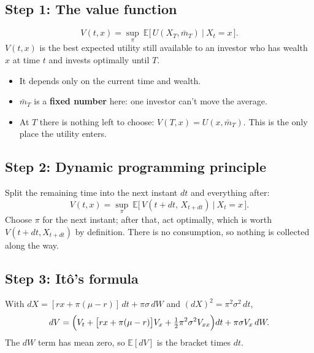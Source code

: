 \documentclass[11pt]{article}
\newcommand{\E}{\mathbb{E}}
\newcommand{\mb}{\bar m}
\begin{document}
\subsection*{Step 1: The value function}
\[
  V(t,x) = \sup_{\pi}\ \E\bigl[\,U(X_T,\mb_T)\ \big|\ X_t = x\,\bigr] .
\]
$V(t,x)$ is the best expected utility still available to an investor who has wealth $x$ at
time $t$ and invests optimally until $T$.
\begin{itemize}
  \item It depends only on the current time and wealth.
  \item $\mb_T$ is a \textbf{fixed number} here: one investor can't move the average.
  \item At $T$ there is nothing left to choose: $V(T,x)=U(x,\mb_T)$. This is the only place
        the utility enters.
\end{itemize}

\subsection*{Step 2: Dynamic programming principle}
Split the remaining time into the next instant $dt$ and everything after:
\[
  V(t,x) = \sup_{\pi}\ \E\bigl[\,V(t+dt,\,X_{t+dt})\ \big|\ X_t = x\,\bigr] .
\]
Choose $\pi$ for the next instant; after that, act optimally, which is worth
$V(t+dt,X_{t+dt})$ by definition. There is no consumption, so nothing is collected along the
way.

\subsection*{Step 3: It\^o's formula}
With $dX = [rx+\pi(\mu-r)]\,dt + \pi\sigma\,dW$ and $(dX)^2=\pi^2\sigma^2\,dt$,
\[
  dV = \Bigl(V_t + \bigl[rx+\pi(\mu-r)\bigr]V_x + \tfrac12\pi^2\sigma^2V_{xx}\Bigr)dt
       + \pi\sigma V_x\,dW .
\]
The $dW$ term has mean zero, so $\E[dV]$ is the bracket times $dt$.
\end{document}
